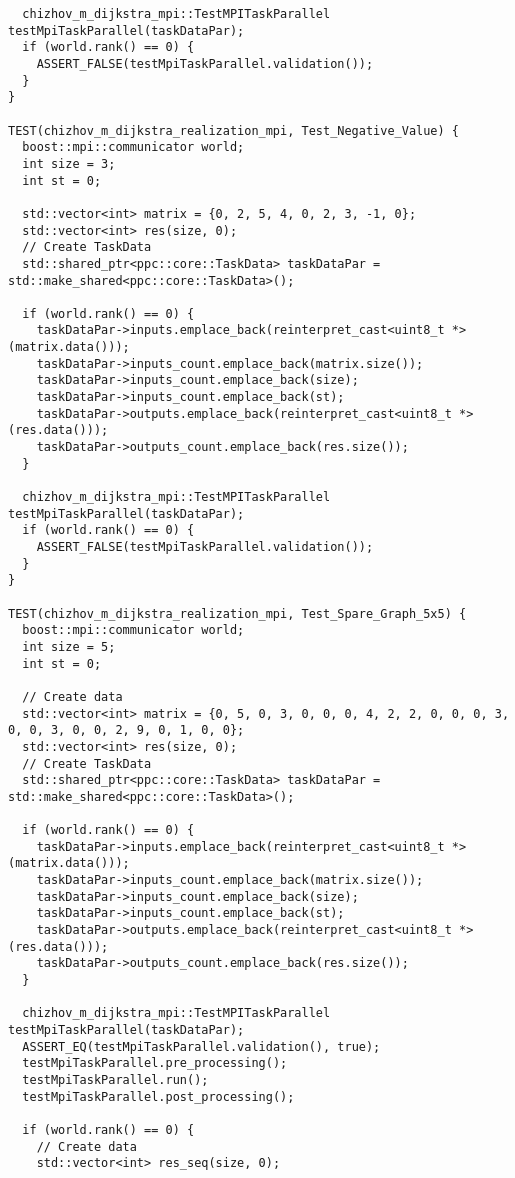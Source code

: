 \documentclass[a4paper, 14pt]{extarticle}
\begin{document}
\begin{lstlisting}
  chizhov_m_dijkstra_mpi::TestMPITaskParallel testMpiTaskParallel(taskDataPar);
  if (world.rank() == 0) {
    ASSERT_FALSE(testMpiTaskParallel.validation());
  }
}

TEST(chizhov_m_dijkstra_realization_mpi, Test_Negative_Value) {
  boost::mpi::communicator world;
  int size = 3;
  int st = 0;
  
  std::vector<int> matrix = {0, 2, 5, 4, 0, 2, 3, -1, 0};
  std::vector<int> res(size, 0);
  // Create TaskData
  std::shared_ptr<ppc::core::TaskData> taskDataPar = std::make_shared<ppc::core::TaskData>();

  if (world.rank() == 0) {
    taskDataPar->inputs.emplace_back(reinterpret_cast<uint8_t *>(matrix.data()));
    taskDataPar->inputs_count.emplace_back(matrix.size());
    taskDataPar->inputs_count.emplace_back(size);
    taskDataPar->inputs_count.emplace_back(st);
    taskDataPar->outputs.emplace_back(reinterpret_cast<uint8_t *>(res.data()));
    taskDataPar->outputs_count.emplace_back(res.size());
  }

  chizhov_m_dijkstra_mpi::TestMPITaskParallel testMpiTaskParallel(taskDataPar);
  if (world.rank() == 0) {
    ASSERT_FALSE(testMpiTaskParallel.validation());
  }
}

TEST(chizhov_m_dijkstra_realization_mpi, Test_Spare_Graph_5x5) {
  boost::mpi::communicator world;
  int size = 5;
  int st = 0;

  // Create data
  std::vector<int> matrix = {0, 5, 0, 3, 0, 0, 0, 4, 2, 2, 0, 0, 0, 3, 0, 0, 3, 0, 0, 2, 9, 0, 1, 0, 0};
  std::vector<int> res(size, 0);
  // Create TaskData
  std::shared_ptr<ppc::core::TaskData> taskDataPar = std::make_shared<ppc::core::TaskData>();

  if (world.rank() == 0) {
    taskDataPar->inputs.emplace_back(reinterpret_cast<uint8_t *>(matrix.data()));
    taskDataPar->inputs_count.emplace_back(matrix.size());
    taskDataPar->inputs_count.emplace_back(size);
    taskDataPar->inputs_count.emplace_back(st);
    taskDataPar->outputs.emplace_back(reinterpret_cast<uint8_t *>(res.data()));
    taskDataPar->outputs_count.emplace_back(res.size());
  }

  chizhov_m_dijkstra_mpi::TestMPITaskParallel testMpiTaskParallel(taskDataPar);
  ASSERT_EQ(testMpiTaskParallel.validation(), true);
  testMpiTaskParallel.pre_processing();
  testMpiTaskParallel.run();
  testMpiTaskParallel.post_processing();

  if (world.rank() == 0) {
    // Create data
    std::vector<int> res_seq(size, 0);


\end{lstlisting}
\end{document}
